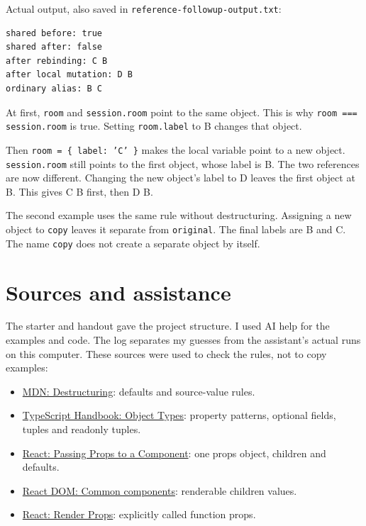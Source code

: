 \documentclass[
  10pt,
  a4paper,
]{article}
\providecommand{\tightlist}{%
  \setlength{\itemsep}{0pt}\setlength{\parskip}{0pt}}
\begin{document}
Actual output, also saved in
\texttt{reference-followup-output.\allowbreak{}txt}:

\begin{minipage}{\linewidth}

\begin{lstlisting}
shared before: true
shared after: false
after rebinding: C B
after local mutation: D B
ordinary alias: B C
\end{lstlisting}

\end{minipage}\par

At first, \texttt{room} and \texttt{session.\allowbreak{}room} point to
the same object. This is why \texttt{room === session.\allowbreak{}room}
is true. Setting \texttt{room.\allowbreak{}label} to B changes that
object.

Then \texttt{room = \{ label:\allowbreak{} 'C' \}} makes the local
variable point to a new object. \texttt{session.\allowbreak{}room} still
points to the first object, whose label is B. The two references are now
different. Changing the new object's label to D leaves the first object
at B. This gives C B first, then D B.

The second example uses the same rule without destructuring. Assigning a
new object to \texttt{copy} leaves it separate from \texttt{original}.
The final labels are B and C. The name \texttt{copy} does not create a
separate object by itself.

\section{Sources and assistance}\label{sources-and-assistance}

The starter and handout gave the project structure. I used AI help for
the examples and code. The log separates my guesses from the assistant's
actual runs on this computer. These sources were used to check the
rules, not to copy examples:

\begin{itemize}
\tightlist
\item
  \href{https://developer.mozilla.org/en-US/docs/Web/JavaScript/Reference/Operators/Destructuring}{MDN:
  Destructuring}: defaults and source-value rules.
\item
  \href{https://www.typescriptlang.org/docs/handbook/2/objects.html}{TypeScript
  Handbook: Object Types}: property patterns, optional fields, tuples
  and readonly tuples.
\item
  \href{https://react.dev/learn/passing-props-to-a-component}{React:
  Passing Props to a Component}: one props object, children and
  defaults.
\item
  \href{https://react.dev/reference/react-dom/components/common}{React
  DOM: Common components}: renderable children values.
\item
  \href{https://legacy.reactjs.org/docs/render-props.html}{React: Render
  Props}: explicitly called function props.
\end{itemize}
\end{document}
